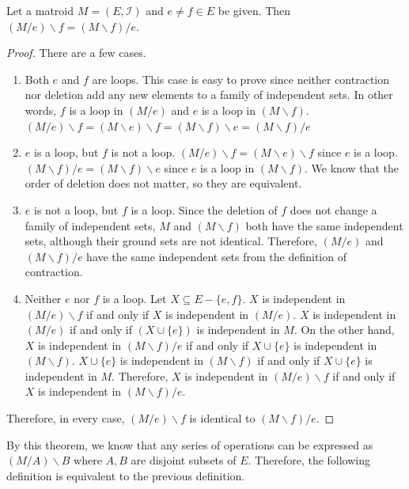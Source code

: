 \begin{thm}
Let a matroid $M = (E, \mathcal{I})$ and $e \neq f \in E$ be given.
Then $(M / e) \backslash f = (M \backslash f) / e$.
\end{thm}

\begin{proof}
There are a few cases.
\begin{enumerate}
\item
Both $e$ and $f$ are loops.
This case is easy to prove since neither contraction nor deletion add any new elements to a family of independent sets.
In other words, $f$ is a loop in $(M / e)$ and $e$ is a loop in $(M \backslash f)$.
$(M / e) \backslash f = (M \backslash e) \backslash f = (M \backslash f) \backslash e = (M \backslash f) / e$
\item
$e$ is a loop, but $f$ is not a loop.
$(M / e) \backslash f = (M \backslash e) \backslash f$ since $e$ is a loop.
$(M \backslash f) / e = (M \backslash f) \backslash e$ since $e$ is a loop in $(M \backslash f)$.
We know that the order of deletion does not matter, so they are equivalent.
\item
$e$ is not a loop, but $f$ is a loop.
Since the deletion of $f$ does not change a family of independent sets,
$M$ and $(M \backslash f)$ both have the same independent sets, although their ground sets are not identical.
Therefore, $(M / e)$ and $(M \backslash f) / e$ have the same independent sets from the definition of contraction.
\item
Neither $e$ nor $f$ is a loop.
Let $X \subseteq E - \{e, f\}$.
$X$ is independent in $(M / e) \backslash f$ if and only if $X$ is independent in $(M / e)$.
$X$ is independent in $(M / e)$ if and only if $(X \cup \{ e \})$ is independent in $M$.
On the other hand, $X$ is independent in $(M \backslash f) / e$ if and only if $X \cup \{ e \}$ is independent in $(M \backslash f)$.
$X \cup \{ e \}$ is independent in $(M \backslash f)$ if and only if $X \cup \{ e \}$ is independent in $M$.
Therefore, $X$ is independent in $(M / e) \backslash f$ if and only if $X$ is independent in $(M \backslash f) / e$.
\end{enumerate}
Therefore, in every case, $(M / e) \backslash f$ is identical to $(M \backslash f) / e$.
\end{proof}

By this theorem, we know that any series of operations can be expressed as $(M / A) \backslash B$ where $A, B$ are disjoint subsets of $E$.
Therefore, the following definition is equivalent to the previous definition.

